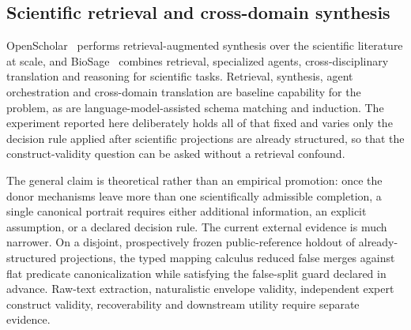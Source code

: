 \subsection{Scientific retrieval and cross-domain synthesis}

OpenScholar~\cite{openScholar2024} performs retrieval-augmented synthesis
over the scientific literature at scale, and BioSage~\cite{biosage2025} combines
retrieval, specialized agents, cross-disciplinary translation and reasoning
for scientific tasks. Retrieval, synthesis, agent orchestration and
cross-domain translation are baseline capability for the problem, as are
language-model-assisted schema matching and induction. The experiment reported
here deliberately holds all of that fixed and varies only the decision rule
applied after scientific projections are already structured, so that the
construct-validity question can be asked without a retrieval confound.

The general claim is theoretical rather than an empirical promotion: once the
donor mechanisms leave more than one scientifically admissible completion, a
single canonical portrait requires either additional information, an explicit
assumption, or a declared decision rule. The current external evidence is much
narrower. On a disjoint, prospectively frozen public-reference holdout of
already-structured projections, the typed mapping calculus reduced false
merges against flat predicate canonicalization while satisfying the
false-split guard declared in advance. Raw-text extraction, naturalistic
envelope validity, independent expert construct validity, recoverability and
downstream utility require separate evidence.
\endinput
